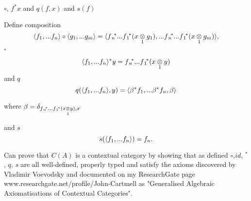 \begin{frame}{$\circ$, $f^*x$ and $q(f,x)$ and $s(f)$}
\newcommand{\pullbackobject}{\fnvectorstar(\crossx{x}{y}{1})}
\newcommand{\deltaterm}{\delta_{\pullbackobject,x}}

Define composition
\begin{equation} 
\tuple{f_1,...f_n}\circ \tuple{g_1,...g_m} 
=\tuple{\fnvectorstar(\crossx{x}{g_1}{1}),...\fnvectorstar(\crossx{x}{g_m}{1})},
\end{equation}
$^*$ 
\begin{equation} 
\tuple{\fn}^*y=\pullbackobject
\end{equation}
and $q$ 
\begin{equation} 
q(\tuple{\fn},y)=
\tuple{{\beta}^*f_1,...{\beta}^*f_n,\beta}
\end{equation}

where 
$\beta = \deltaterm$

and $s$ 
\begin{equation} 
s(\tuple{\fn})=f_n.
\end{equation}

Can prove that $C(A)$ is a contextual category by showing that as defined
$\circ$,$id$, $^*$, $q$, $s$ are all well-defined, properly typed and satisfy the axioms discovered by Vladimir Voevodsky and documented on my ResearchGate page
www.researchgate.net/profile/John-Cartmell
as 
"Generalised Algebraic Axiomatisations of Contextual Categories".
\end{frame}


